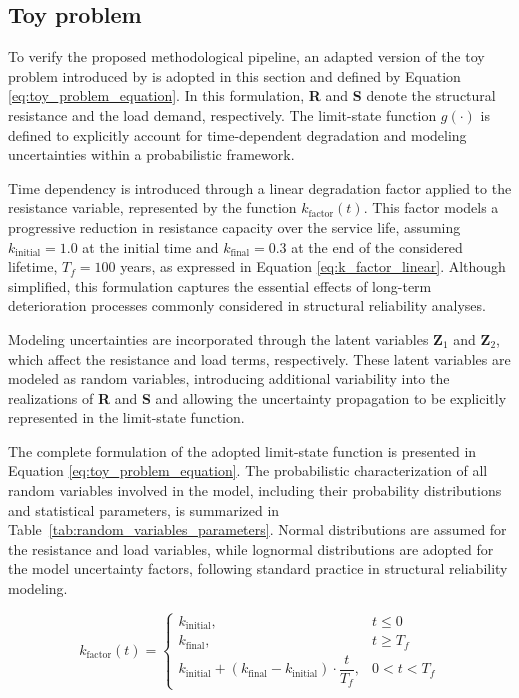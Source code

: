 \subsection{Toy problem}

To verify the proposed methodological pipeline, an adapted version of the toy problem introduced by \citet{pires_reliability_2024} is adopted in this section and defined by Equation \eqref{eq:toy_problem_equation}. In this formulation, \textbf{R} and \textbf{S} denote the structural resistance and the load demand, respectively. The limit-state function $g(\cdot)$ is defined to explicitly account for time-dependent degradation and modeling uncertainties within a probabilistic framework.

Time dependency is introduced through a linear degradation factor applied to the resistance variable, represented by the function $k_{\text{factor}}(t)$. This factor models a progressive reduction in resistance capacity over the service life, assuming $k_{\text{initial}} = 1.0$ at the initial time and $k_{\text{final}} = 0.3$ at the end of the considered lifetime, $T_f = 100$ years, as expressed in Equation \eqref{eq:k_factor_linear}. Although simplified, this formulation captures the essential effects of long-term deterioration processes commonly considered in structural reliability analyses.

Modeling uncertainties are incorporated through the latent variables $\textbf{Z}_1$ and $\textbf{Z}_2$, which affect the resistance and load terms, respectively. These latent variables are modeled as random variables, introducing additional variability into the realizations of \textbf{R} and \textbf{S} and allowing the uncertainty propagation to be explicitly represented in the limit-state function.

The complete formulation of the adopted limit-state function is presented in Equation \eqref{eq:toy_problem_equation}. The probabilistic characterization of all random variables involved in the model, including their probability distributions and statistical parameters, is summarized in Table~\ref{tab:random_variables_parameters}. Normal distributions are assumed for the resistance and load variables, while lognormal distributions are adopted for the model uncertainty factors, following standard practice in structural reliability modeling.

\begin{equation}
k_{\text{factor}}(t) = 
\begin{cases} 
k_{\text{initial}}, & t \leq 0 \\[5pt]
k_{\text{final}}, & t \geq T_f \\[5pt]
k_{\text{initial}} + (k_{\text{final}} - k_{\text{initial}}) \cdot \dfrac{t}{T_f}, & 0 < t < T_f 
\end{cases}
\label{eq:k_factor_linear}
\end{equation}

